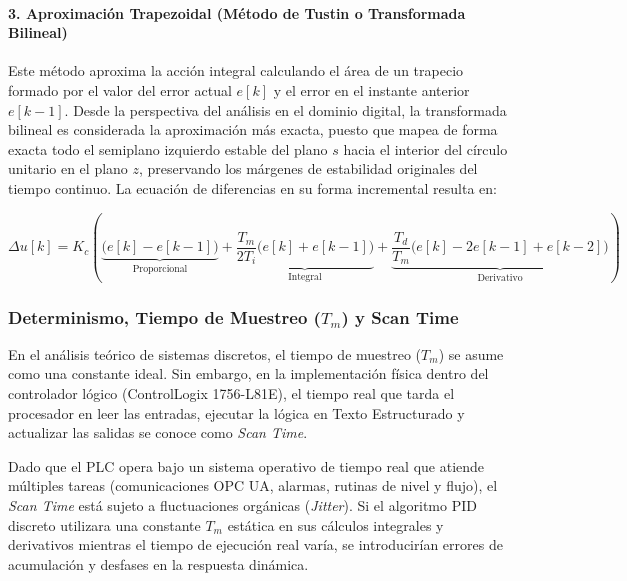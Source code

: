 \paragraph{3. Aproximación Trapezoidal (Método de Tustin o Transformada Bilineal)}
Este método aproxima la acción integral calculando el área de un trapecio formado por el valor del error actual $e[k]$ y el error en el instante anterior $e[k-1]$. Desde la perspectiva del análisis en el dominio digital, la transformada bilineal es considerada la aproximación más exacta, puesto que mapea de forma exacta todo el semiplano izquierdo estable del plano $s$ hacia el interior del círculo unitario en el plano $z$, preservando los márgenes de estabilidad originales del tiempo continuo. La ecuación de diferencias en su forma incremental resulta en:

\begin{equation}
  \label{eq:trapecio}
  \Delta u[k] = K_c \left( \underbrace{\big(e[k] - e[k-1]\big)}_{\text{Proporcional}} + \underbrace{\frac{T_m}{2 T_i} \big(e[k] + e[k-1]\big)}_{\text{Integral}} + \underbrace{\frac{T_d}{T_m} \big(e[k] - 2e[k-1] + e[k-2]\big)}_{\text{Derivativo}} \right)
\end{equation}
\clearpage
\subsubsection{Determinismo, Tiempo de Muestreo ($T_m$) y Scan Time}
En el análisis teórico de sistemas discretos, el tiempo de muestreo ($T_m$) se asume como una constante ideal. Sin embargo, en la implementación física dentro del controlador lógico (ControlLogix 1756-L81E), el tiempo real que tarda el procesador en leer las entradas, ejecutar la lógica en Texto Estructurado y actualizar las salidas se conoce como \textit{Scan Time}. 

Dado que el PLC opera bajo un sistema operativo de tiempo real que atiende múltiples tareas (comunicaciones OPC UA, alarmas, rutinas de nivel y flujo), el \textit{Scan Time} está sujeto a fluctuaciones orgánicas (\textit{Jitter}). Si el algoritmo PID discreto utilizara una constante $T_m$ estática en sus cálculos integrales y derivativos mientras el tiempo de ejecución real varía, se introducirían errores de acumulación y desfases en la respuesta dinámica.

